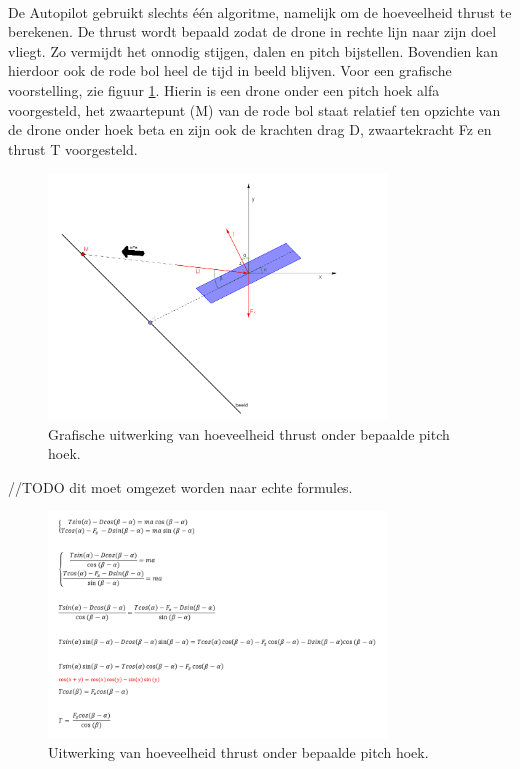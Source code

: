 \\
De Autopilot gebruikt slechts één algoritme, namelijk om de hoeveelheid thrust te berekenen. De thrust wordt bepaald zodat de drone in rechte lijn naar zijn doel vliegt. Zo vermijdt het onnodig stijgen, dalen en pitch bijstellen. Bovendien kan hierdoor ook de rode bol heel de tijd in beeld blijven. Voor een grafische voorstelling, zie figuur \ref{fig:GrafischeUitwerkingVanHoeveelheidThrustOnderBepaaldePitch}. Hierin is een drone onder een pitch hoek alfa voorgesteld, het zwaartepunt (M) van de rode bol staat relatief ten opzichte van de drone onder hoek beta en zijn ook de krachten drag D, zwaartekracht Fz en thrust T voorgesteld.

\begin{figure}[h]
	\centering
	\includegraphics[width=0.8\textwidth]{GrafischeUitwerkingVanHoeveelheidThrustOnderBepaaldePitch.png}
	\caption{Grafische uitwerking van hoeveelheid thrust onder bepaalde pitch hoek.}
	\label{fig:GrafischeUitwerkingVanHoeveelheidThrustOnderBepaaldePitch}
\end{figure}

//TODO dit moet omgezet worden naar echte formules. 
\begin{figure}[h]
	\centering
	\includegraphics[width=0.8\textwidth]{UitwerkingBerekeningVanHoeveelheidThrustOnderBepaaldePitch.png}
	\caption{Uitwerking van hoeveelheid thrust onder bepaalde pitch hoek.}
	\label{fig:UitwerkingBerekeningVanHoeveelheidThrustOnderBepaaldePitch}
\end{figure}

